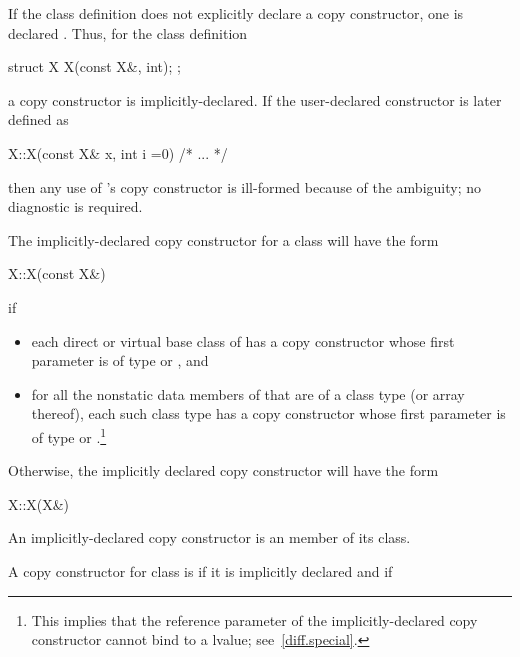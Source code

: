\pnum
{}%
If the class definition does not explicitly declare a copy constructor,
one is declared .
Thus, for the class definition

\begin{codeblock}
struct X {
	X(const X&, int);
};
\end{codeblock}

a copy constructor is implicitly-declared.
If the user-declared constructor is later defined as

\begin{codeblock}
X::X(const X& x, int i =0) { /* ... */ }
\end{codeblock}

then any use of
's
copy constructor is ill-formed because of the ambiguity;
no diagnostic is required.

\pnum
The implicitly-declared copy constructor for a class
will have the form

\begin{codeblock}
X::X(const X&)
\end{codeblock}

if

\begin{itemize}
\item
each direct or virtual base class
of
has a copy constructor whose first parameter is of type
or
,
and
\item
for all the nonstatic data members of
that are of a class type
(or array thereof),
each such class type has a copy constructor whose first parameter is of type
or
.\footnote{This implies that the reference parameter of the
implicitly-declared copy constructor
cannot bind to a
lvalue; see~\ref{diff.special}.}
\end{itemize}

Otherwise, the implicitly declared copy constructor will have the form

\begin{codeblock}
X::X(X&)
\end{codeblock}

An implicitly-declared copy constructor is an 
 member of its class.

\pnum
{}%
A copy constructor for class
is
if it is implicitly declared and if

